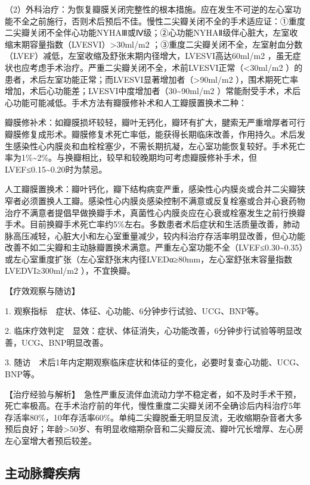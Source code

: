 （2）外科治疗：为恢复瓣膜关闭完整性的根本措施。应在发生不可逆的左心室功能不全之前施行，否则术后预后不佳。慢性二尖瓣关闭不全的手术适应证：①重度二尖瓣关闭不全伴心功能NYHAⅢ或Ⅳ级；②心功能NYHAⅡ级伴心脏大，左室收缩末期容量指数（LVESVI）\textgreater{}30ml/m{2}
；③重度二尖瓣关闭不全，左室射血分数（LVEF）减低，左室收缩及舒张末期内径增大，LVESVI高达60ml/m{2}
，虽无症状也应考虑手术治疗。严重二尖瓣关闭不全，术前LVESVI正常（\textless{}30ml/m{2}
）的患者，术后左室功能正常；而LVESVI显著增加者（\textgreater{}90ml/m{2}
），围术期死亡率增加，术后心功能差；LVESVI中度增加者（30\textasciitilde{}90ml/m{2}
）常能耐受手术，术后心功能可能减低。手术方法有瓣膜修补术和人工瓣膜置换术二种：

瓣膜修补术：如瓣膜损坏较轻，瓣叶无钙化，瓣环有扩大，腱索无严重增厚者可行瓣膜修复成形术。瓣膜修复术死亡率低，能获得长期临床改善，作用持久。术后发生感染性心内膜炎和血栓栓塞少，不需长期抗凝，左心室功能恢复较好。手术死亡率为1\%\textasciitilde{}2\%。与换瓣相比，较早和较晚期均可考虑瓣膜修补手术，但LVEF≤0.15\textasciitilde{}0.20时为禁忌。

人工瓣膜置换术：瓣叶钙化，瓣下结构病变严重，感染性心内膜炎或合并二尖瓣狭窄者必须置换人工瓣。感染性心内膜炎感染控制不满意或反复栓塞或合并心衰药物治疗不满意者提倡早做换瓣手术，真菌性心内膜炎应在心衰或栓塞发生之前行换瓣手术。目前换瓣手术死亡率约5\%左右。多数患者术后症状和生活质量改善，肺动脉高压减轻，心脏大小和左心室重量减少，较内科治疗存活率明显改善，但心功能改善不如二尖瓣和主动脉瓣置换术满意。严重左心室功能不全（LVEF≤0.30\textasciitilde{}0.35）或左心室重度扩张（左心室舒张末内径LVEDα≥80mm，左心室舒张末容量指数LVEDVI≥300ml/m{2}
），不宜换瓣。

【疗效观察与随访】

1. 观察指标　症状、体征、心功能、6分钟步行试验、UCG、BNP等。

2.
临床疗效判定　显效：症状、体征消失，心功能改善，6分钟步行试验等明显改善，UCG、BNP明显改善。

3.
随访　术后1年内定期观察临床症状和体征的变化，必要时复查心功能、UCG、BNP等。

【治疗经验与解析】　急性严重反流伴血流动力学不稳定者，如不及时手术干预，死亡率极高。在手术治疗前的年代，慢性重度二尖瓣关闭不全确诊后内科治疗5年存活率80\%，10年存活率60\%。单纯二尖瓣脱垂无明显反流，无收缩期杂音者大多预后良好；年龄\textgreater{}50岁、有明显收缩期杂音和二尖瓣反流、瓣叶冗长增厚、左心房左心室增大者预后较差。

\subsection{主动脉瓣疾病}

